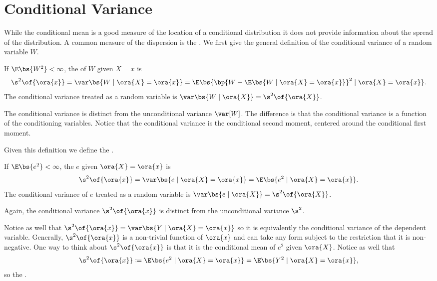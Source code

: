 \section{Conditional Variance}

While the conditional mean is a good measure of the location of a conditional distribution it does not provide information about the spread of the distribution. A common measure of the dispersion is the . We first give the general definition of the conditional variance of a random variable $W$.

\begin{definition}
    If $\E\bs{W^2}<\infty$, the  of $W$ given $X = x$ is 
    \begin{equation}
        \notag
        \s^2\of{\ora{x}} = \var\bs{W \mid \ora{X} = \ora{x}} = \E\bs{\bp{W - \E\bs{W \mid \ora{X} = \ora{x}}}^2 \mid \ora{X} = \ora{x}}.
    \end{equation}
    The conditional variance treated as a random variable is $\var\bs{W \mid \ora{X}} = \s^2\of{\ora{X}}$.
\end{definition}

The conditional variance is distinct from the unconditional variance $\var[W]$. {The difference is that the conditional variance is a function of the conditioning variables.} Notice that the conditional variance is the conditional second moment, centered around the conditional first moment.

Given this definition we define the .

\begin{definition}
    If $\E\bs{e^2} < \infty$, the  $e$ given $\ora{X} = \ora{x}$ is 
    \begin{equation}
        \notag
        \s^2\of{\ora{x}} = \var\bs{e \mid \ora{X} = \ora{x}} = \E\bs{e^2 \mid \ora{X} = \ora{x}}.
    \end{equation}
    The conditional variance of $e$ treated as a random variable is $\var\bs{e \mid \ora{X}} = \s^2\of{\ora{X}}$.
\end{definition}

Again, the conditional variance $\s^2\of{\ora{x}}$ is distinct from the unconditional variance $\s^2$. 

Notice as well that $\s^2\of{\ora{x}} = \var\bs{Y \mid \ora{X} = \ora{x}}$ so it is equivalently the conditional variance of the dependent variable. Generally, $\s^2\of{\ora{x}}$ is a non-trivial function of $\ora{x}$ and can take any form subject to the restriction that it is non-negative. One way to think about $\s^2\of{\ora{x}}$ is that it is the conditional mean of $e^2$ given $\ora{X}$. Notice as well that
\begin{equation}
    \notag 
    \s^2\of{\ora{x}} \coloneqq \E\bs{e^2 \mid \ora{X} = \ora{x}} = \E\bs{Y^2 \mid \ora{X} = \ora{x}},
\end{equation}
so the .

